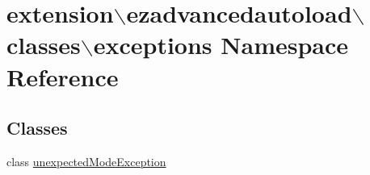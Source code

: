 \hypertarget{namespaceextension_1_1ezadvancedautoload_1_1classes_1_1exceptions}{\section{extension$\backslash$ezadvancedautoload$\backslash$classes$\backslash$exceptions \-Namespace \-Reference}
\label{namespaceextension_1_1ezadvancedautoload_1_1classes_1_1exceptions}
}
\subsection*{\-Classes}
\begin{DoxyCompactItemize}
\item 
class \hyperlink{classextension_1_1ezadvancedautoload_1_1classes_1_1exceptions_1_1unexpected_mode_exception}{unexpected\-Mode\-Exception}
\end{DoxyCompactItemize}
